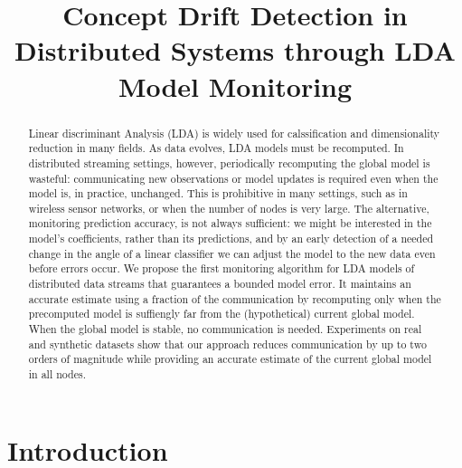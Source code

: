 \documentclass[11pt,twocolumn,varwidth=true,a4paper,fleqn]{article}
\begin{document}
\nocite{*}

\title{Concept Drift Detection in Distributed Systems through LDA
Model Monitoring}
\date{}
\maketitle

\begin{abstract}
Linear discriminant Analysis (LDA) is widely used for calssification and
dimensionality reduction in many fields. As data evolves, LDA models must be recomputed. 
In distributed streaming settings, however, periodically recomputing the global model is
wasteful: communicating new observations or model updates is required even when the model 
is, in practice, unchanged.
This is prohibitive in many settings, such as in wireless sensor
networks, or when the number of nodes is very large. The
alternative, monitoring prediction accuracy, is not always
sufficient: we might be interested in the model's coefficients, rather than its
predictions, and by an early detection of a needed change in the angle of
a linear classifier we can adjust the model to the new data even before errors
occur.
We propose the first monitoring algorithm for LDA
models of distributed data streams that guarantees a bounded model error. 
It maintains an accurate estimate using a fraction of the communication by recomputing only
when the precomputed model is suffiengly far from the
(hypothetical) current global model. When the global model
is stable, no communication is needed.
Experiments on real and synthetic datasets show that
our approach reduces communication by up to two orders
of magnitude while providing an accurate estimate of the
current global model in all nodes.
\end{abstract}

\section{Introduction}
\end{document}
